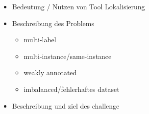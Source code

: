 \begin{itemize}
	\item Bedeutung / Nutzen von Tool Lokalisierung
	\item Beschreibung des Problems
	\begin{itemize}
		\item multi-label
		\item multi-instance/same-instance
		\item weakly annotated
		\item imbalanced/fehlerhaftes dataset
	\end{itemize}
	\item Beschreibung und ziel des challenge
\end{itemize}